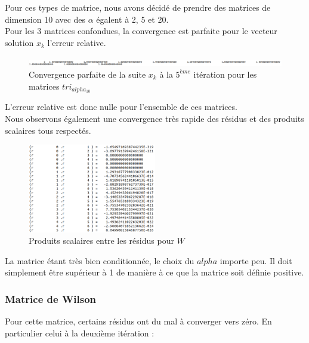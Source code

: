 \documentclass[12,french]{report}
\begin{document}
Pour ces types de matrice, nous avons décidé de prendre des matrices de dimension 10 avec des $\alpha$ égalent à 2, 5 et 20.\\

Pour les 3 matrices confondues, la convergence est parfaite pour le vecteur solution $x_k$ l'erreur relative. \\

\begin{figure}[H]
	\centering
	\includegraphics[width=1\textwidth]{./Images/x_tri}
	\caption{Convergence parfaite de la suite $x_k$ à la $5^{ème}$ itération pour les matrices $tri_{alpha_{10}}$}
\end{figure}\vspace{0.2cm}

L'erreur relative est donc nulle pour l'ensemble de ces matrices.\\

Nous observons également une convergence très rapide des résidus et des produits scalaires tous respectés.\\

\begin{figure}[H]
	\centering
	\includegraphics[width=0.5\textwidth]{./Images/ps_tri_20_10}
	\caption{Produits scalaires entre les résidus pour $W$}
\end{figure}\vspace{0.2cm}

La matrice étant très bien conditionnée, le choix du $alpha$ importe peu. Il doit simplement être supérieur à 1 de manière à ce que la matrice soit définie positive.

\subsubsection{Matrice de Wilson}

Pour cette matrice, certains résidus ont du mal à converger vers zéro. En particulier celui à la deuxième itération :\\
\end{document}
